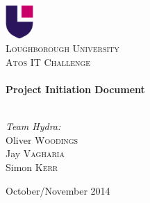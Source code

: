 \begin{titlepage}
\begin{center}

\includegraphics[width=0.08\textwidth]{./img/lu-logo.png}~\\[3cm]

\textsc{\LARGE Loughborough University}\\[2.5cm]

\textsc{\Large Atos IT Challenge}\\[0.5cm]

\HRule \\[0.4cm]
{ \huge \bfseries Project Initiation Document \\[0.4cm] }

\HRule \\[1.5cm]

\noindent
\large
\emph{Team Hydra:}\\
Oliver \textsc{Woodings}\\
Jay \textsc{Vagharia}\\
Simon \textsc{Kerr}
\vfill

{\large October/November 2014}

\end{center}
\end{titlepage}